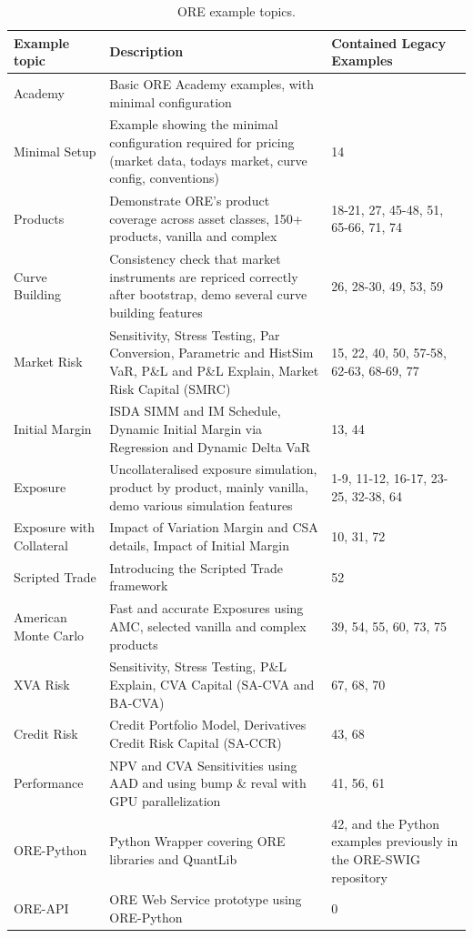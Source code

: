\begin{table}[hbt]
\scriptsize
\begin{center}
\begin{tabular}{|l|p{6cm}|p{4cm}|}
\hline
Example topic & Description & Contained Legacy Examples\\
\hline
\hline
Academy & Basic ORE Academy examples, with minimal configuration & \\
\hline
Minimal Setup & Example showing the minimal configuration required
for pricing (market data, todays market, curve config, conventions)
& 14 \\
\hline
Products & Demonstrate ORE's product coverage across asset classes,
150+ products, vanilla and complex
& 18-21, 27, 45-48, 51, 65-66, 71, 74\\
\hline
Curve Building & Consistency check that market instruments are repriced correctly
after bootstrap, demo several curve building features
& 26, 28-30, 49, 53, 59 \\
\hline
Market Risk & Sensitivity, Stress Testing, Par Conversion, Parametric and HistSim VaR,
P\&L and P\&L Explain, Market Risk Capital (SMRC)
& 15, 22, 40, 50, 57-58, 62-63, 68-69, 77\\
\hline
Initial Margin & ISDA SIMM and IM Schedule, Dynamic Initial Margin via Regression
and Dynamic Delta VaR
& 13, 44\\
\hline
Exposure & Uncollateralised exposure simulation, product by product, mainly vanilla,
demo various simulation features
& 1-9, 11-12, 16-17, 23-25, 32-38, 64\\
\hline
Exposure with Collateral & Impact of Variation Margin and CSA details,
Impact of Initial Margin
& 10, 31, 72\\
\hline
Scripted Trade & Introducing the Scripted Trade framework
& 52 \\
\hline
American Monte Carlo & Fast and accurate Exposures using AMC,
selected vanilla and complex products
& 39, 54, 55, 60, 73, 75\\
\hline
XVA Risk & Sensitivity, Stress Testing, P\&L Explain,
CVA Capital (SA-CVA and BA-CVA)
& 67, 68, 70\\
\hline
Credit Risk & Credit Portfolio Model, Derivatives Credit Risk Capital (SA-CCR)
& 43, 68\\
\hline
Performance & NPV and CVA Sensitivities using AAD
and using bump \& reval with GPU parallelization
& 41, 56, 61\\
\hline
ORE-Python & Python Wrapper covering ORE libraries and QuantLib
& 42, and the Python examples previously in the ORE-SWIG repository\\
\hline
ORE-API & ORE Web Service prototype using ORE-Python
& 0\\
\hline
\end{tabular}
\caption{ORE example topics.}
\label{tab_0}
\end{center}
\end{table}
\clearpage

